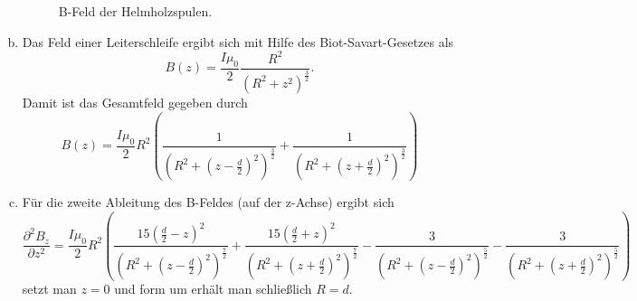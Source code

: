 \begin{enumerate}[(a)]
\begin{figure}[htbp]
\begin{tikzpicture}
\end{tikzpicture}
\caption{B-Feld der Helmholzspulen.}
\label{fig:same}
\end{figure}

\item Das Feld einer Leiterschleife ergibt sich mit Hilfe des Biot-Savart-Gesetzes als 
\begin{equation}
  B(z)=\frac{I\mu_0}{2}\frac{R^2}{\left(R^2+z^2\right)^{\frac{3}{2}}}.
\end{equation}
Damit ist das Gesamtfeld gegeben durch
\begin{equation}
    B(z)=\frac{I\mu_0}{2}R^2\left(\frac{1}{\left(R^2+(z- \frac{d}{2})^2\right)^{\frac{3}{2}}}+\frac{1}{\left(R^2+(z+ \frac{d}{2})^2\right)^{\frac{3}{2}}}\right)
\end{equation}

\item 
  Für die zweite Ableitung des B-Feldes (auf der z-Achse) ergibt sich
\begin{equation*}
  \frac{\partial^2B_z}{\partial z^2}=\frac{I\mu_0}{2}R^2\left(\frac{15(\frac{d}{2}-z)^2}{(R^2+(z- \frac{d}{2})^2)^{\frac{7}{2}}}+\frac{15(\frac{d}{2}+z)^2}{(R^2+(z+ \frac{d}{2})^2)^{\frac{7}{2}}}-\frac{3}{(R^2+(z- \frac{d}{2})^2)^{\frac{5}{2}}}-\frac{3}{(R^2+(z+ \frac{d}{2})^2)^{\frac{5}{2}}}\right)
\end{equation*}
setzt man $z=0$ und form um erhält man schließlich $R=d$.

\end{enumerate}




